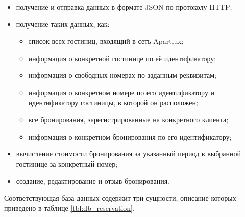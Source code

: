 \begin{itemize}
	\item получение и отправка данных в формате JSON по протоколу HTTP;
	
	\item получение таких данных, как:
	
	\begin{itemize}
		\item список всех гостиниц, входящий в сеть Apartlux;
		
		\item информация о конкретной гостинице по её идентификатору;
		
		\item информация о свободных номерах по заданным реквизитам;
		
		\item информация о конкретном номере по его идентификатору и идентификатору гостиницы, в которой он расположен;
		
		\item все бронирования, зарегистрированные на конкретного клиента;
		
		\item информация о конкретном бронирования по его идентификатору;
	\end{itemize}
	
	\item вычисление стоимости бронирования за указанный период в выбранной гостинице за конкретный номер;
	
	\item создание, редактирование и отзыв бронирования.
\end{itemize}
Соответствующая база данных содержит три сущности, описание которых приведено в таблице \ref{tbl:db_reservation}.
